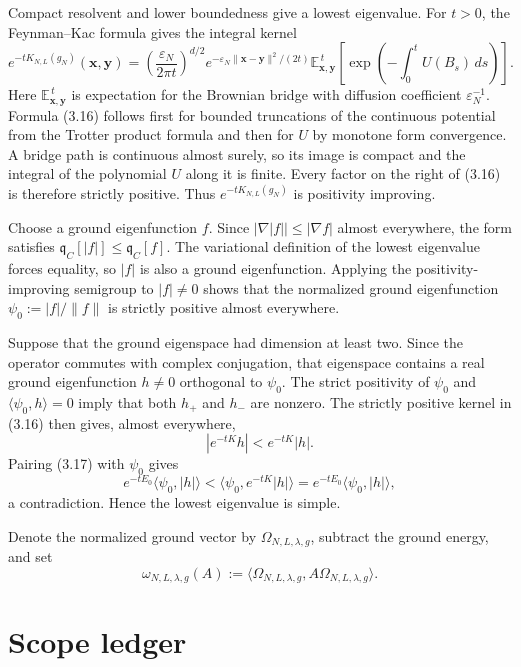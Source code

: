 \documentclass[11pt,a4paper]{article}
\newcommand{\eps}{\varepsilon}
\newcommand{\dd}{\,d}
\begin{document}
Compact resolvent and lower boundedness give a lowest eigenvalue.  For \(t>0\),
the Feynman--Kac formula gives the integral kernel
\[
 e^{-tK_{N,L}(g_N)}(\bm x,\bm y)
 =\left(\frac{\eps_N}{2\pi t}\right)^{d/2}
   e^{-\eps_N\|\bm x-\bm y\|^2/(2t)}
   \mathbb E_{\bm x,\bm y}^{\,t}
   \left[\exp\!\left(-\int_0^tU(B_s)\dd s\right)\right].     \tag{3.16}
\]
Here \(\mathbb E_{\bm x,\bm y}^{\,t}\) is expectation for the Brownian
bridge with diffusion coefficient \(\eps_N^{-1}\).  Formula (3.16) follows
first for bounded truncations of the continuous potential from the Trotter
product formula and then for \(U\) by monotone form convergence.  A bridge
path is continuous almost surely, so its image is compact and the integral of
the polynomial \(U\) along it is finite.  Every factor on the right of (3.16)
is therefore strictly positive.  Thus \(e^{-tK_{N,L}(g_N)}\) is positivity
improving.

Choose a ground eigenfunction \(f\).  Since
\(|\nabla|f||\le|\nabla f|\) almost everywhere, the form satisfies
\(\mathfrak q_C[|f|]\le\mathfrak q_C[f]\).  The variational definition of the
lowest eigenvalue forces equality, so \(|f|\) is also a ground eigenfunction.
Applying the positivity-improving semigroup to \(|f|\ne0\) shows that the
normalized ground eigenfunction
\(\psi_0:=|f|/\|f\|\) is strictly positive almost everywhere.

Suppose that the ground eigenspace had dimension at least two.  Since the
operator commutes with complex conjugation, that eigenspace contains a real
ground eigenfunction \(h\ne0\) orthogonal to \(\psi_0\).  The strict positivity
of \(\psi_0\) and \(\langle\psi_0,h\rangle=0\) imply that both \(h_+\) and
\(h_-\) are nonzero.  The strictly positive kernel in (3.16) then gives, almost
everywhere,
\[
 |e^{-tK}h|<e^{-tK}|h|.                                       \tag{3.17}
\]
Pairing (3.17) with \(\psi_0\) gives
\[
 e^{-tE_0}\langle\psi_0,|h|\rangle
 <\langle\psi_0,e^{-tK}|h|\rangle
 =e^{-tE_0}\langle\psi_0,|h|\rangle,
\]
a contradiction.  Hence the lowest eigenvalue is simple.  \QedStep

Denote the normalized ground vector by \(\Omega_{N,L,\lambda,g}\), subtract the ground
energy, and set
\[
 \omega_{N,L,\lambda,g}(A)
 :=\langle\Omega_{N,L,\lambda,g},A\Omega_{N,L,\lambda,g}\rangle. \tag{3.18}
\]

\section{Scope ledger}
\end{document}
